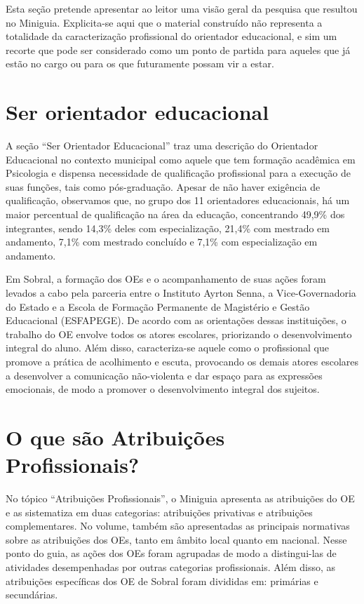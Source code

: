 \documentclass[
  letterpaper,
  DIV=11,
  numbers=noendperiod,
  oneside]{scrreprt}
\begin{document}
Esta seção pretende apresentar ao leitor uma visão geral da pesquisa que
resultou no Miniguia. Explicita-se aqui que o material construído não
representa a totalidade da caracterização profissional do orientador
educacional, e sim um recorte que pode ser considerado como um ponto de
partida para aqueles que já estão no cargo ou para os que futuramente
possam vir a estar.

\hypertarget{ser-orientador-educacional}{%
\section{Ser orientador educacional}\label{ser-orientador-educacional}}

A seção ``Ser Orientador Educacional'' traz uma descrição do Orientador
Educacional no contexto municipal como aquele que tem formação acadêmica
em Psicologia e dispensa necessidade de qualificação profissional para a
execução de suas funções, tais como pós-graduação. Apesar de não haver
exigência de qualificação, observamos que, no grupo dos 11 orientadores
educacionais, há um maior percentual de qualificação na área da
educação, concentrando 49,9\% dos integrantes, sendo 14,3\% deles com
especialização, 21,4\% com mestrado em andamento, 7,1\% com mestrado
concluído e 7,1\% com especialização em andamento.

Em Sobral, a formação dos OEs e o acompanhamento de suas ações foram
levados a cabo pela parceria entre o Instituto Ayrton Senna, a
Vice-Governadoria do Estado e a Escola de Formação Permanente de
Magistério e Gestão Educacional (ESFAPEGE). De acordo com as orientações
dessas instituições, o trabalho do OE envolve todos os atores escolares,
priorizando o desenvolvimento integral do aluno. Além disso,
caracteriza-se aquele como o profissional que promove a prática de
acolhimento e escuta, provocando os demais atores escolares a
desenvolver a comunicação não-violenta e dar espaço para as expressões
emocionais, de modo a promover o desenvolvimento integral dos sujeitos.

\hypertarget{o-que-suxe3o-atribuiuxe7uxf5es-profissionais}{%
\section{O que são Atribuições
Profissionais?}\label{o-que-suxe3o-atribuiuxe7uxf5es-profissionais}}

No tópico ``Atribuições Profissionais'', o Miniguia apresenta as
atribuições do OE e as sistematiza em duas categorias: atribuições
privativas e atribuições complementares. No volume, também são
apresentadas as principais normativas sobre as atribuições dos OEs,
tanto em âmbito local quanto em nacional. Nesse ponto do guia, as ações
dos OEs foram agrupadas de modo a distingui-las de atividades
desempenhadas por outras categorias profissionais. Além disso, as
atribuições específicas dos OE de Sobral foram divididas em: primárias e
secundárias.
\end{document}
